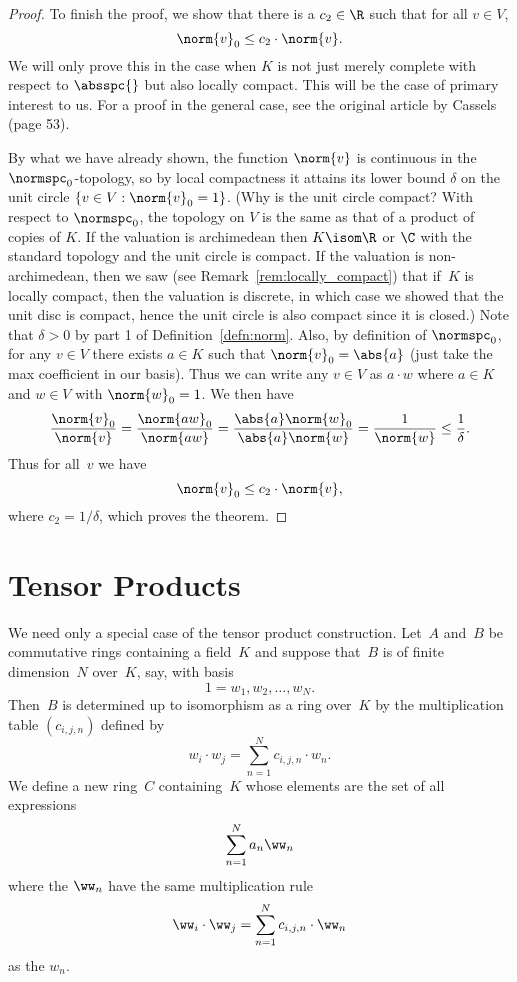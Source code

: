 \documentclass[11pt]{book}
\begin{document}
\begin{ch}
\begin{proof}
To finish the proof, we show that there is a
$c_2\in \R$ such that for all $v\in V$,
$$
 \norm{v}_0 \leq c_2 \cdot \norm{v}.
$$
We will only prove this in the case when $K$ is not just merely complete
with respect to $\absspc{}$ but also locally compact.  This will
be the case of primary interest to us.  For a proof in the general case,
see the original article by Cassels (page 53).

By what we have already shown, the function $\norm{v}$ is continuous
in the $\normspc_0$-topology, so by local compactness it attains its
lower bound $\delta$ on the unit circle $\left\{v\in V :
  \norm{v}_0=1\right\}$.  (Why is the unit circle compact?  With
respect to $\normspc_0$, the topology on $V$ is the same as that of a
product of copies of $K$.  If the valuation is archimedean then
$K\isom \R$ or $\C$ with the standard topology and the unit circle is
compact.  If the valuation is non-archimedean, then we saw (see
Remark~\ref{rem:locally_compact}) that if~$K$ is locally compact, then
the valuation is discrete, in which case we showed that the unit disc
is compact, hence the unit circle is also compact since it is closed.)
Note that $\delta>0$ by part 1 of Definition~\ref{defn:norm}.  Also,
by definition of $\normspc_0$, for any $v\in V$ there exists $a\in K$
such that $\norm{v}_0 = \abs{a}$ (just take the max coefficient in our
basis).  Thus we can write any $v\in V$ as $a\cdot w$ where $a\in K$
and $w\in V$ with $\norm{w}_0=1$.  We then have
$$
\frac{\norm{v}_0}{\norm{v}} =
\frac{\norm{aw}_0}{\norm{aw}}
= \frac{\abs{a}\norm{w}_0}{\abs{a}\norm{w}}
= \frac{1}{\norm{w}} \leq \frac{1}{\delta}.
$$
Thus for
all~$v$ we have
$$\norm{v}_0\leq c_2\cdot \norm{v},$$
where $c_2 = 1/\delta$, which proves the theorem.
\end{proof}


\section{Tensor Products} \label{sec:tensor}
We need only a special case of the tensor product construction.
Let~$A$ and~$B$ be commutative rings containing a field~$K$ and suppose that~$B$ is of finite dimension~$N$ over~$K$, say, with basis
$$
  1=w_1, w_2, \ldots, w_N.
$$
Then~$B$ is determined up to isomorphism as a ring over~$K$
by the multiplication table $(c_{i,j,n})$ defined by
$$
   w_i \cdot w_j = \sum_{n=1}^N c_{i,j,n} \cdot w_n.
$$
We define a new ring~$C$ containing~$K$ whose elements are
the set of all expressions
$$
\sum_{n=1}^N a_n \ww_n
$$
where the $\ww_n$ have the same multiplication rule
$$
   \ww_i \cdot \ww_j = \sum_{n=1}^N c_{i,j,n} \cdot \ww_n
$$
as the $w_n$.


\end{ch}
\end{document}

